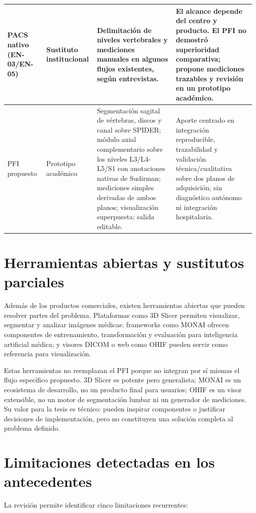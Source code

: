 \begin{longtable}{|>{\raggedright\arraybackslash}p{}|>{\raggedright\arraybackslash}p{}|>{\raggedright\arraybackslash}p{}|>{\raggedright\arraybackslash}p{}|}
\hline
PACS nativo (EN-03/EN-05) & Sustituto institucional & Delimitación de niveles vertebrales y mediciones manuales en algunos flujos existentes, según entrevistas. & El alcance depende del centro y producto. El PFI no demostró superioridad comparativa; propone mediciones trazables y revisión en un prototipo académico. \\
\hline
PFI propuesto & Prototipo académico & Segmentación sagital de vértebras, discos y canal sobre SPIDER; módulo axial complementario sobre los niveles L3/L4-L5/S1 con anotaciones nativas de Sudirman; mediciones simples derivadas de ambos planos; visualización superpuesta; salida editable. & Aporte centrado en integración reproducible, trazabilidad y validación técnica/cualitativa sobre dos planos de adquisición, sin diagnóstico autónomo ni integración hospitalaria. \\
\hline
\end{longtable}
\endgroup

\section{Herramientas abiertas y sustitutos parciales}

Además de los productos comerciales, existen herramientas abiertas que pueden resolver partes del problema. Plataformas como 3D Slicer permiten visualizar, segmentar y analizar imágenes médicas; frameworks como MONAI ofrecen componentes de entrenamiento, transformación y evaluación para inteligencia artificial médica; y visores DICOM o web como OHIF pueden servir como referencia para visualización.

Estas herramientas no reemplazan el PFI porque no integran por sí mismas el flujo específico propuesto. 3D Slicer es potente pero generalista; MONAI es un ecosistema de desarrollo, no un producto final para usuarios; OHIF es un visor extensible, no un motor de segmentación lumbar ni un generador de mediciones. Su valor para la tesis es técnico: pueden inspirar componentes o justificar decisiones de implementación, pero no constituyen una solución completa al problema definido.

\section{Limitaciones detectadas en los antecedentes}

La revisión permite identificar cinco limitaciones recurrentes:

